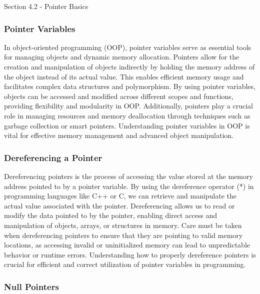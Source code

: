 \begin{notes}{Section 4.2 - Pointer Basics}
    \subsubsection*{Pointer Variables}

    In object-oriented programming (OOP), pointer variables serve as essential tools for managing objects and dynamic memory allocation. Pointers allow for the creation and manipulation of objects indirectly by holding the memory address 
    of the object instead of its actual value. This enables efficient memory usage and facilitates complex data structures and polymorphism. By using pointer variables, objects can be accessed and modified across different scopes and functions, 
    providing flexibility and modularity in OOP. Additionally, pointers play a crucial role in managing resources and memory deallocation through techniques such as garbage collection or smart pointers. Understanding pointer variables in OOP 
    is vital for effective memory management and advanced object manipulation.
    
    \subsubsection*{Dereferencing a Pointer}
    
    Dereferencing pointers is the process of accessing the value stored at the memory address pointed to by a pointer variable. By using the dereference operator (*) in programming languages like C++ or C, we can retrieve and manipulate the actual 
    value associated with the pointer. Dereferencing allows us to read or modify the data pointed to by the pointer, enabling direct access and manipulation of objects, arrays, or structures in memory. Care must be taken when dereferencing pointers 
    to ensure that they are pointing to valid memory locations, as accessing invalid or uninitialized memory can lead to unpredictable behavior or runtime errors. Understanding how to properly dereference pointers is crucial for efficient and correct 
    utilization of pointer variables in programming.
    
    \subsubsection*{Null Pointers}
    

\end{notes}
